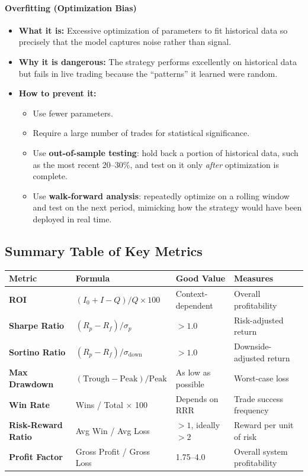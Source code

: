 \documentclass[12pt,openany]{book}
\begin{document}
\paragraph{Overfitting (Optimization Bias)}
\begin{itemize}[leftmargin=*]
    \item \textbf{What it is:} Excessive optimization of parameters to fit historical data so precisely that the model captures noise rather than signal.
    \item \textbf{Why it is dangerous:} The strategy performs excellently on historical data but fails in live trading because the ``patterns'' it learned were random.
    \item \textbf{How to prevent it:}
    \begin{itemize}[leftmargin=*]
        \item Use fewer parameters.
        \item Require a large number of trades for statistical significance.
        \item Use \textbf{out-of-sample testing}: hold back a portion of historical data, such as the most recent 20--30\%, and test on it only \emph{after} optimization is complete.
        \item Use \textbf{walk-forward analysis}: repeatedly optimize on a rolling window and test on the next period, mimicking how the strategy would have been deployed in real time.
    \end{itemize}
\end{itemize}

\subsection{Summary Table of Key Metrics}

\begin{center}
\small
\begin{tabular}{|L{0.18\textwidth}|L{0.30\textwidth}|L{0.18\textwidth}|L{0.22\textwidth}|}
\hline
\textbf{Metric} & \textbf{Formula} & \textbf{Good Value} & \textbf{Measures} \\
\hline
\textbf{ROI} & $(I_0 + I - Q)/Q \times 100$ & Context-dependent & Overall profitability \\
\hline
\textbf{Sharpe Ratio} & $(R_p - R_f)/\sigma_p$ & $> 1.0$ & Risk-adjusted return \\
\hline
\textbf{Sortino Ratio} & $(R_p - R_f)/\sigma_{\text{down}}$ & $> 1.0$ & Downside-adjusted return \\
\hline
\textbf{Max Drawdown} & $(\text{Trough} - \text{Peak})/\text{Peak}$ & As low as possible & Worst-case loss \\
\hline
\textbf{Win Rate} & Wins / Total $\times$ 100 & Depends on RRR & Trade success frequency \\
\hline
\textbf{Risk-Reward Ratio} & Avg Win / Avg Loss & $> 1$, ideally $> 2$ & Reward per unit of risk \\
\hline
\textbf{Profit Factor} & Gross Profit / Gross Loss & 1.75--4.0 & Overall system profitability \\
\hline
\end{tabular}
\end{center}
\end{document}
